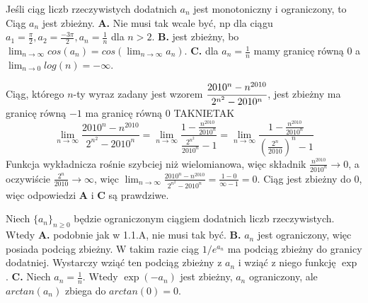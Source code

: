 \begin{solutions}
    \sol Jeśli ciąg liczb rzeczywistych dodatnich $a_n$ jest monotoniczny i ograniczony, to
    Ciąg $a_n$ jest zbieżny. \textbf{A.} Nie musi tak wcale być, np dla ciągu $a_1=\frac{\pi}{2}, a_2=\frac{-3\pi}{2}, a_n=\frac{1}{n}$ dla $n> 2$. \textbf{B.} jest zbieżny, bo $\lim_{n\to\infty}cos(a_n)=cos\left(\lim_{n\to\infty}a_n\right)$. \textbf{C.} dla $a_n=\frac{1}{n}$ mamy granicę równą $0$ a $\lim_{n\to 0}log(n) = -\infty$.
    
    \sol Ciąg, którego $n$-ty wyraz zadany jest wzorem $\cfrac{2010^n - n^{2010}}{2^{n^2}-2010^n}$,
    \answerss
    {jest zbieżny}
    {ma granicę równą $-1$}
    {ma granicę równą 0}
    {TAK}{NIE}{TAK}
    $$
    \lim_{n\to\infty}\frac{2010^n - n^{2010}}{2^{n^2}-2010^n} = \lim_{n\to\infty}\frac{1 - \frac{n^{2010}}{2010^n}}{\frac{2^{n^2}}{2010^n}-1} = \lim_{n\to\infty}\frac{1 - \frac{n^{2010}}{2010^n}}{(\frac{2^{n}}{2010})^n-1}
    $$
    Funkcja wykładnicza rośnie szybciej niż wielomianowa, więc składnik $\frac{n^{2010}}{2010^n}\to0$, a oczywiście $\frac{2^n}{2010}\to\infty$, więc $\lim_{n\to\infty}\frac{2010^n - n^{2010}}{2^{n^2}-2010^n}=\frac{1-0}{\infty-1}=0$. Ciąg jest zbieżny do 0, więc odpowiedzi \textbf{A} i \textbf{C} są prawdziwe.
    
    \sol Niech $\{a_n\}_{n \geq 0}$ będzie ograniczonym ciągiem dodatnich liczb rzeczywistych. Wtedy
    \textbf{A.} podobnie jak w 1.1.A, nie musi tak być. \textbf{B.} $a_n$ jest ograniczony, więc posiada podciąg zbieżny. W takim razie ciąg $1/e^{a_n}$ ma podciąg zbieżny do granicy dodatniej. Wystarczy wziąć ten podciąg zbieżny z $a_n$ i wziąć z niego funkcję $\exp$. \textbf{C.} Niech $a_n=\frac{1}{n}$. Wtedy $\exp(-a_n)$ jest zbieżny, $a_n$ ograniczony, ale $arctan(a_n)$ zbiega do $arctan(0)=0$.
    

\end{solutions}
